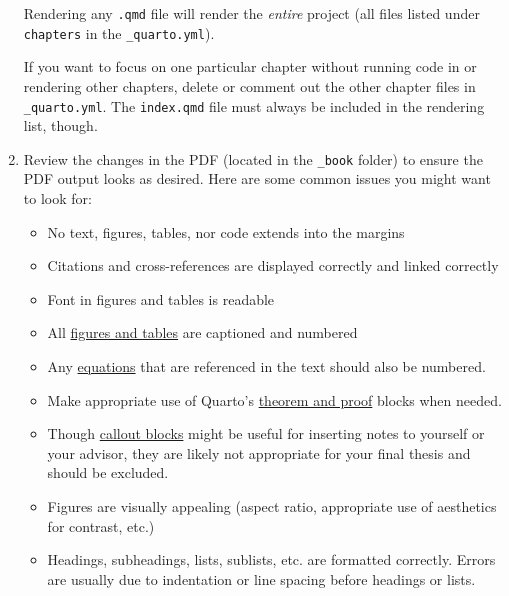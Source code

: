 \documentclass[
  11pt,
  letterpaper,
  twoside]{report}
\begin{document}
\begin{enumerate}
  \begin{tcolorbox}[enhanced jigsaw, coltitle=black, leftrule=.75mm, titlerule=0mm, rightrule=.15mm, toprule=.15mm, opacityback=0, colbacktitle=quarto-callout-note-color!10!white, breakable, colback=white, left=2mm, opacitybacktitle=0.6, bottomtitle=1mm, bottomrule=.15mm, colframe=quarto-callout-note-color-frame, title=\textcolor{quarto-callout-note-color}{\faInfo}\hspace{0.5em}{Note}, arc=.35mm, toptitle=1mm]

  Rendering any \texttt{.qmd} file will render the \emph{entire} project
  (all files listed under \texttt{chapters} in the
  \texttt{\_quarto.yml}).

  If you want to focus on one particular chapter without running code in
  or rendering other chapters, delete or comment out the other chapter
  files in \texttt{\_quarto.yml}. The \texttt{index.qmd} file must
  always be included in the rendering list, though.

  \end{tcolorbox}
\item
  Review the changes in the PDF (located in the \texttt{\_book} folder)
  to ensure the PDF output looks as desired. Here are some common issues
  you might want to look for:

  \begin{itemize}
  \item
    No text, figures, tables, nor code extends into the margins
  \item
    Citations and cross-references are displayed correctly and linked
    correctly
  \item
    Font in figures and tables is readable
  \item
    All
    \href{https://quarto.org/docs/authoring/cross-references.html\#floats}{figures
    and tables} are captioned and numbered
  \item
    Any
    \href{https://quarto.org/docs/authoring/cross-references.html\#equations}{equations}
    that are referenced in the text should also be numbered.
  \item
    Make appropriate use of Quarto's
    \href{https://quarto.org/docs/authoring/cross-references.html\#theorems-and-proofs}{theorem
    and proof} blocks when needed.
  \item
    Though
    \href{https://quarto.org/docs/authoring/callouts.html}{callout
    blocks} might be useful for inserting notes to yourself or your
    advisor, they are likely not appropriate for your final thesis and
    should be excluded.
  \item
    Figures are visually appealing (aspect ratio, appropriate use of
    aesthetics for contrast, etc.)
  \item
    Headings, subheadings, lists, sublists, etc. are formatted
    correctly. Errors are usually due to indentation or line spacing
    before headings or lists.


\end{itemize}
\end{enumerate}
\end{document}
